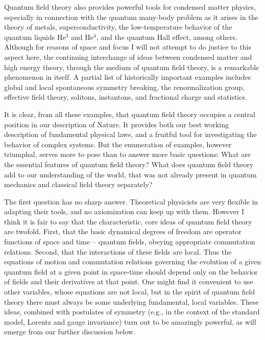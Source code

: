 \documentclass[12pt]{article}
\begin{document}
Quantum field theory also provides powerful tools for condensed matter
physics, especially in connection with the quantum many-body problem
as it arises in the theory of metals, superconductivity, the
low-temperature behavior of the quantum liquids He$^3$ and He$^4$, and
the quantum Hall effect, among others.  Although for reasons of space
and focus I will not attempt to do justice to this aspect here, the
continuing interchange of ideas between condensed matter and high
energy theory, through the medium of quantum field theory, is a
remarkable phenomenon in itself.  A partial list of historically
important examples includes global and local spontaneous symmetry
breaking, the renormalization group, effective field theory, solitons,
instantons, and fractional charge and statistics. 

It is clear, from all
these examples, that quantum field theory occupies a central position
in our description of Nature.  It provides both our best working
description of fundamental physical laws, and a fruitful tool for
investigating the behavior of complex systems.  But the enumeration of
examples, however triumphal, serves more to pose than to answer more
basic questions: What are the essential features of quantum field
theory?  What does quantum field theory add to our understanding of
the world, that was not already present in quantum mechanics and
classical field theory separately?  

The first question has no sharp
answer.  Theoretical physicists are very flexible in adapting their
tools, and no axiomization can keep up with them.  However I think it
is fair to say that the characteristic, core ideas of quantum field
theory are twofold.  First, that the basic dynamical degrees of
freedom are operator functions of space and time -- quantum fields,
obeying appropriate commutation relations.  Second, that the
interactions of these fields are local.  Thus the equations of motion
and commutation relations governing the evolution of a given quantum
field at a given point in space-time should depend only on the
behavior of fields and their derivatives at that point.  One might
find it convenient to use other variables, whose equations are not
local, but in the spirit of quantum field theory there must always be
some underlying fundamental, local variables.  These ideas, combined
with postulates of symmetry (e.g., in the context of the standard
model, Lorentz and gauge invariance) turn out to be amazingly
powerful, as will emerge from our further discussion below.  
\end{document}
